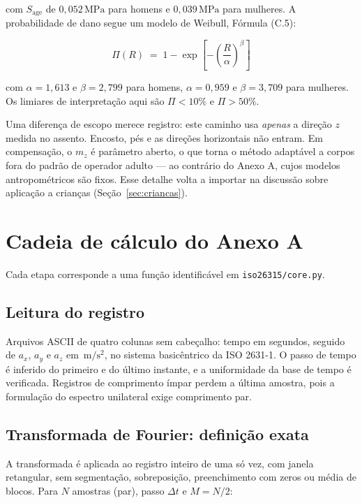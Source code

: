 \documentclass[11pt,a4paper]{article}
\newcommand{\code}[1]{\texttt{\small #1}}
\newcommand{\unit}[2]{\ensuremath{#1\,\mathrm{#2}}}
\begin{document}
\noindent
com $S_{\mathrm{age}}$ de \unit{0{,}052}{MPa} para homens e \unit{0{,}039}{MPa}
para mulheres. A probabilidade de dano segue um modelo de Weibull, Fórmula
(C.5):

\begin{equation}
\Pi(R) \;=\; 1 - \exp\!\left[-\left(\frac{R}{\alpha}\right)^{\beta}\right]
\label{eq:weibull}
\end{equation}

\noindent
com $\alpha = 1{,}613$ e $\beta = 2{,}799$ para homens, $\alpha = 0{,}959$ e
$\beta = 3{,}709$ para mulheres. Os limiares de interpretação aqui são
$\Pi < 10\%$ e $\Pi > 50\%$.

Uma diferença de escopo merece registro: este caminho usa \emph{apenas} a
direção $z$ medida no assento. Encosto, pés e as direções horizontais não
entram. Em compensação, o $m_z$ é parâmetro aberto, o que torna o método
adaptável a corpos fora do padrão de operador adulto --- ao contrário do Anexo
A, cujos modelos antropométricos são fixos. Esse detalhe volta a importar na
discussão sobre aplicação a crianças (Seção~\ref{sec:criancas}).

\section{Cadeia de cálculo do Anexo A}
\label{sec:cadeiaA}

Cada etapa corresponde a uma função identificável em \code{iso26315/core.py}.

\subsection{Leitura do registro}

Arquivos ASCII de quatro colunas sem cabeçalho: tempo em segundos, seguido de
$a_x$, $a_y$ e $a_z$ em \unit{}{m/s^2}, no sistema basicêntrico da ISO 2631-1.
O passo de tempo é inferido do primeiro e do último instante, e a uniformidade
da base de tempo é verificada. Registros de comprimento ímpar perdem a última
amostra, pois a formulação do espectro unilateral exige comprimento par.

\subsection{Transformada de Fourier: definição exata}
\label{sec:fft}

A transformada é aplicada ao registro inteiro de uma só vez, com janela
retangular, sem segmentação, sobreposição, preenchimento com zeros ou média de
blocos. Para $N$ amostras (par), passo $\Delta t$ e $M = N/2$:
\end{document}
